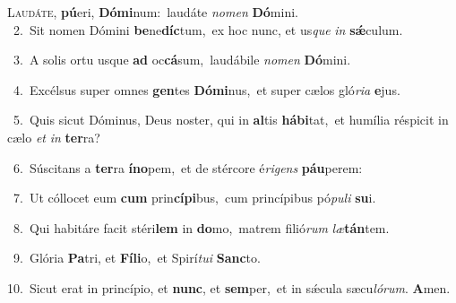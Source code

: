 \lettrine{\initial\textcolor{\initialcolor}{L}}{audáte,} \textbf{pú}\-eri, \textbf{Dó}\-\textbf{mi}num:~\star laudáte \textit{no}\-\textit{men} \textbf{Dó}\-mini.\\
{\numbfont\textcolor{\numbcolor}{~2.}}~Sit nomen Dómini \textbf{be}\-ne\-\textbf{díc}\-tum,~\star ex hoc nunc, et us\textit{que} \textit{in} \textbf{sǽ}\-culum.\par
{\numbfont\textcolor{\numbcolor}{~3.}}~A solis ortu usque \textbf{ad} oc\-\textbf{cá}\-sum,~\star laudábile \textit{no}\-\textit{men} \textbf{Dó}\-mini.\par
{\numbfont\textcolor{\numbcolor}{~4.}}~Excélsus super omnes \textbf{gen}\-tes \textbf{Dó}\-\textbf{mi}nus,~\star et super cælos gló\-\textit{ri}\-\textit{a} \textbf{e}\-jus.\par
{\numbfont\textcolor{\numbcolor}{~5.}}~Quis sicut Dóminus, Deus noster, qui in \textbf{al}\-tis \textbf{há}\-\textbf{bi}tat,~\star et humília réspicit in cælo \textit{et} \textit{in} \textbf{ter}\-ra?\par
{\numbfont\textcolor{\numbcolor}{~6.}}~Súscitans a \textbf{ter}\-ra \textbf{ín}\-\textbf{o}pem,~\star et de stércore é\-\textit{ri}\-\textit{gens} \textbf{páu}\-perem:\par
{\numbfont\textcolor{\numbcolor}{~7.}}~Ut cóllocet eum \textbf{cum} prin\-\textbf{cí}\-\textbf{pi}bus,~\star cum princípibus pó\-\textit{pu}\-\textit{li} \textbf{su}\-i.\par
{\numbfont\textcolor{\numbcolor}{~8.}}~Qui habitáre facit stéri\textbf{lem} in \textbf{do}\-mo,~\star matrem filió\textit{rum} \textit{læ}\-\textbf{tán}tem.\par
{\numbfont\textcolor{\numbcolor}{~9.}}~Glória \textbf{Pa}\-tri, et \textbf{Fí}\-\textbf{li}o,~\star et Spirí\-\textit{tu}\-\textit{i} \textbf{Sanc}\-to.\par
{\numbfont\textcolor{\numbcolor}{10.}}~Sicut erat in princípio, et \textbf{nunc}\-, et \textbf{sem}\-per,~\star et in sǽcula sæcu\-\textit{ló}\-\textit{rum}. \textbf{A}\-men.\par
